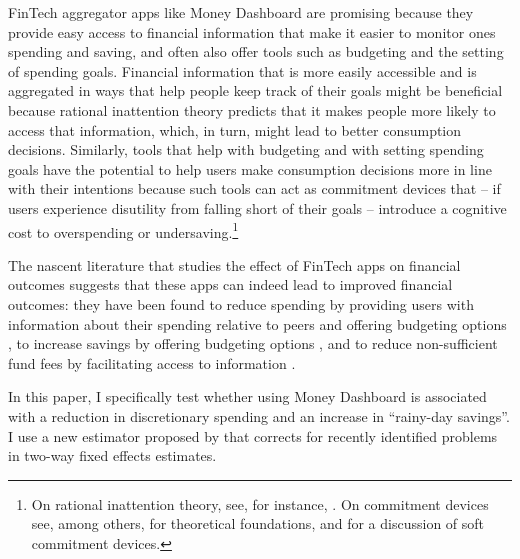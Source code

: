 FinTech aggregator apps like Money Dashboard are promising because they provide
easy access to financial information that make it easier to monitor ones
spending and saving, and often also offer tools such as budgeting and the
setting of spending goals. Financial information that
is more easily accessible and is aggregated in ways that help people keep track
of their goals might be beneficial because rational inattention theory predicts
that it makes people more likely to access that information, which, in turn,
might lead to better consumption decisions. Similarly, tools that help with
budgeting and with setting spending goals have the potential to help users make
consumption decisions more in line with their intentions because such tools can
act as commitment devices that -- if users experience disutility from falling
short of their goals -- introduce a cognitive cost to overspending or
undersaving.\footnote{On rational inattention theory, see, for instance,
    \citet{brunnermeier2008wealth, dellavigna2009psychology,
    sims2003implications}. On commitment devices see, among others,
    \citet{thaler1981economic, laibson1997golden, o1999doing} for theoretical
    foundations, and \citet{beshears2016beyond, hsiaw2013goal} for a discussion
of soft commitment devices.}

The nascent literature that studies the effect of FinTech apps on financial
outcomes suggests that these apps can indeed lead to improved financial
outcomes: they have been found to reduce spending by providing users with
information about their spending relative to peers
\citep{dacunto2020crowdsourcing} and offering budgeting options
\citep{lukas2022influence}, to increase savings by offering budgeting options
\citep{gargano2021goal}, and to reduce non-sufficient fund fees by facilitating
access to information \citep{carlin2022mobile}.

In this paper, I specifically test whether using Money Dashboard is associated
with a reduction in discretionary spending and an increase in ``rainy-day
savings''. I use a new estimator proposed by \citet{callaway2021difference}
that corrects for recently identified problems in two-way fixed effects
estimates.

